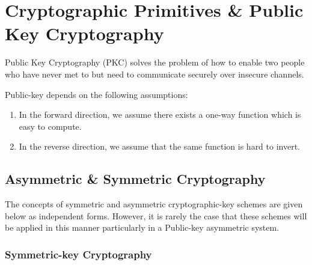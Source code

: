 \section{Cryptographic Primitives \& Public Key Cryptography}


Public Key Cryptography (PKC) solves the problem of how to enable two people who have never met to but need to communicate securely over insecure channels. 
 

Public-key depends on the following assumptions: 
\begin{enumerate}
 \item In the forward direction, we assume there exists a one-way function which is easy to compute.
 \item In the reverse direction, we assume that the same function is hard to invert. 
 \end{enumerate}
 
 
 

\subsection{Asymmetric \& Symmetric Cryptography} 

The concepts of symmetric and asymmetric cryptographic-key schemes are given below as independent forms. However, it is rarely the case that these schemes will be applied in this manner particularly in a Public-key asymmetric system.

\subsubsection{Symmetric-key Cryptography} 

